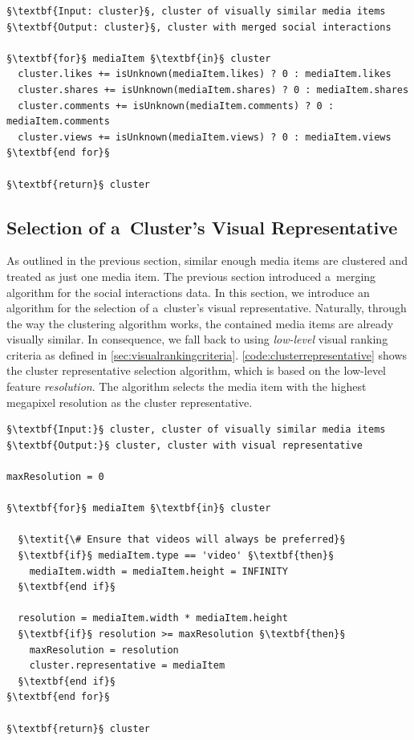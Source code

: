 \begin{lstlisting}[caption=The social interactions merging algorithm,
  label=code:merging, float=!ht, escapechar=§]
§\textbf{Input: cluster}§, cluster of visually similar media items 
§\textbf{Output: cluster}§, cluster with merged social interactions 

§\textbf{for}§ mediaItem §\textbf{in}§ cluster
  cluster.likes += isUnknown(mediaItem.likes) ? 0 : mediaItem.likes
  cluster.shares += isUnknown(mediaItem.shares) ? 0 : mediaItem.shares
  cluster.comments += isUnknown(mediaItem.comments) ? 0 : mediaItem.comments
  cluster.views += isUnknown(mediaItem.views) ? 0 : mediaItem.views
§\textbf{end for}§

§\textbf{return}§ cluster
\end{lstlisting}

\subsection{Selection of a~Cluster's Visual Representative}  

As outlined in the previous section, similar enough media items
are clustered and treated as just one media item.
The previous section introduced
a~merging algorithm for the social interactions data.
In this section, we introduce an algorithm for the selection of
a~cluster's visual representative.
Naturally, through the way the clustering algorithm works,
the contained media items are already visually similar. 
In consequence, we fall back to using \emph{low-level}
visual ranking criteria as defined in \autoref{sec:visualrankingcriteria}.
\autoref{code:clusterrepresentative} shows the cluster representative
selection algorithm, which is based on the low-level feature \emph{resolution}.
The algorithm selects the media item with the highest megapixel resolution
as the cluster representative.

\begin{lstlisting}[caption=Pseudocode of the cluster visual representative selection algorithm that finds the highest quality media item of a~cluster,
  label=code:clusterrepresentative, float, escapechar=§]
§\textbf{Input:}§ cluster, cluster of visually similar media items
§\textbf{Output:}§ cluster, cluster with visual representative
  
maxResolution = 0

§\textbf{for}§ mediaItem §\textbf{in}§ cluster
  
  §\textit{\# Ensure that videos will always be preferred}§  
  §\textbf{if}§ mediaItem.type == 'video' §\textbf{then}§
    mediaItem.width = mediaItem.height = INFINITY
  §\textbf{end if}§ 
    
  resolution = mediaItem.width * mediaItem.height
  §\textbf{if}§ resolution >= maxResolution §\textbf{then}§
    maxResolution = resolution
    cluster.representative = mediaItem
  §\textbf{end if}§  
§\textbf{end for}§

§\textbf{return}§ cluster     
\end{lstlisting}

